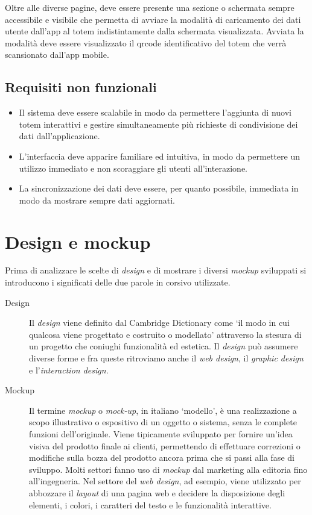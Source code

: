 Oltre alle diverse pagine, deve essere presente una sezione o schermata sempre accessibile e visibile che permetta di avviare la modalità di caricamento dei dati utente dall'app al totem indistintamente dalla schermata visualizzata. Avviata la modalità deve essere visualizzato il qrcode identificativo del totem che verrà scansionato dall'app mobile.
%
\subsection{Requisiti non funzionali}
\begin{itemize}
    \item Il sistema deve essere scalabile in modo da permettere l'aggiunta di nuovi totem interattivi e gestire simultaneamente più richieste di condivisione dei dati dall'applicazione.
    \item L'interfaccia deve apparire familiare ed intuitiva, in modo da permettere un utilizzo immediato e non scoraggiare gli utenti all'interazione.
    \item La sincronizzazione dei dati deve essere, per quanto possibile, immediata in modo da mostrare sempre dati aggiornati.
\end{itemize}
%
%
%
\section{Design e mockup}
Prima di analizzare le scelte di \textit{design} e di mostrare i diversi \textit{mockup} sviluppati si introducono i significati delle due parole in corsivo utilizzate.

\begin{description}
    \item[Design] Il \textit{design} viene definito dal Cambridge Dictionary \cite{cambridgeDict} come \enquote*{il modo in cui qualcosa viene progettato e costruito o modellato} attraverso la stesura di un progetto che coniughi funzionalità ed estetica. Il \textit{design} può assumere diverse forme e fra queste ritroviamo anche il \textit{web design}, il \textit{graphic design} e l'\textit{interaction design}.
    \item[Mockup] Il termine \textit{mockup} o \textit{mock-up}, in italiano \enquote*{modello}, è una realizzazione a scopo illustrativo o espositivo di un oggetto o sistema, senza le complete funzioni dell'originale. Viene tipicamente sviluppato per fornire un'idea visiva del prodotto finale ai clienti, permettendo di effettuare correzioni o modifiche sulla bozza del prodotto ancora prima che si passi alla fase di sviluppo. Molti settori fanno uso di \textit{mockup} dal marketing alla editoria fino all'ingegneria. Nel settore del \textit{web design}, ad esempio, viene utilizzato per abbozzare il \textit{layout} di una pagina web e decidere la disposizione degli elementi, i colori, i caratteri del testo e le funzionalità interattive.
\end{description}


